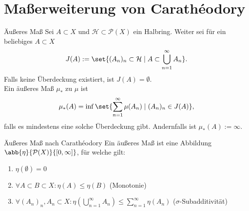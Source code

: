 \section*{Maßerweiterung von Carathéodory}

\begin{karte}{Äußeres Maß}
	Sei \(A \subset X\) und \( \mathcal{H} \subset \mathcal{P}(X) \) ein Halbring.
	Weiter sei für ein beliebiges \(A \subset X\) 
	\[ J(A) := \set{ (A_n)_n \subset \mathcal{H} \;|\; A \subset \bigcup_{n=1}^\infty A_n }. \]
	Falls keine Überdeckung existiert, ist \(J(A) = \emptyset\).\\
	Ein äußeres Maß \( \mu_* \) zu \(\mu\) ist 
	\[ \mu_*(A) = \inf \set{ \sum_{n=1}^\infty \mu(A_n) \;|\; (A_n)_n\in J(A) }, \]
	falls es mindestens eine solche Überdeckung gibt.
	Andernfalls ist \( \mu_*(A) := \infty \).
\end{karte}

\begin{karte}{Äußeres Maß nach Carathéodory}
	Ein äußeres Maß ist eine Abbildung \( \abb{\eta}{\mathcal{P}(X)}{[0,\infty]} \), für welche gilt:
	\begin{enumerate}
		\item \(\eta(\emptyset) = 0\)
		\item \( \forall A \subset B \subset X: \eta(A) \leq \eta(B) \) (Monotonie)
		\item \( \forall (A_n)_n, A_n \subset X: \eta(\bigcup_{n=1}^\infty A_n) \leq \sum_{n=1}^\infty \eta(A_n) \) (\(\sigma\)-Subadditivität)
	\end{enumerate}
\end{karte}